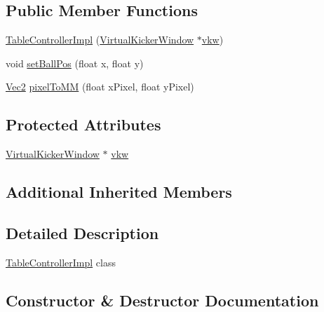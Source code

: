 \subsection*{Public Member Functions}
\begin{DoxyCompactItemize}
\item 
\hyperlink{class_table_controller_impl_a758311eb8fa51fdc1188aa5eaea4225a}{Table\+Controller\+Impl} (\hyperlink{class_virtual_kicker_window}{Virtual\+Kicker\+Window} $\ast$\hyperlink{class_table_controller_impl_af7dbc908fb9205938c254f748649d555}{vkw})
\item 
void \hyperlink{class_table_controller_impl_aee69b16268f5a6e2578a58dde481dddf}{set\+Ball\+Pos} (float x, float y)
\item 
\hyperlink{class_vec2}{Vec2} \hyperlink{class_table_controller_impl_a8e5631578a95b69889e1acd64fd31abc}{pixel\+To\+MM} (float x\+Pixel, float y\+Pixel)
\end{DoxyCompactItemize}
\subsection*{Protected Attributes}
\begin{DoxyCompactItemize}
\item 
\hyperlink{class_virtual_kicker_window}{Virtual\+Kicker\+Window} $\ast$ \hyperlink{class_table_controller_impl_af7dbc908fb9205938c254f748649d555}{vkw}
\end{DoxyCompactItemize}
\subsection*{Additional Inherited Members}


\subsection{Detailed Description}
\hyperlink{class_table_controller_impl}{Table\+Controller\+Impl} class 

\subsection{Constructor \& Destructor Documentation}
